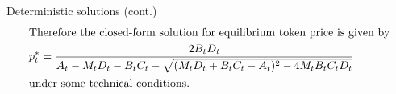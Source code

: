 \documentclass{beamer}
\begin{document}
\begin{frame}[noframenumbering]{Deterministic solutions (cont.)}
    \begin{align}
        \intertext{Therefore the closed-form solution for equilibrium token price is given by}
        p_t^* &= \frac{2B_tD_t}{A_t-M_t D_t-B_tC_t - \sqrt{(M_t D_t+B_t C_t-A_t)^2-4M_t B_tC_tD_t}}\\
        \intertext{under some technical conditions.}\nonumber
    \end{align}
    
\end{frame}
\end{document}
